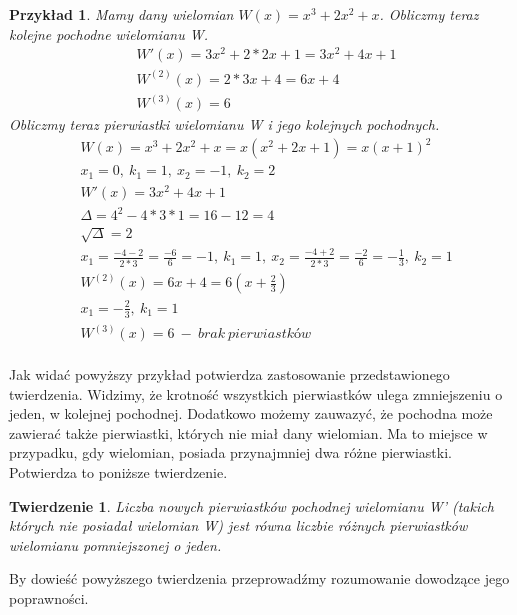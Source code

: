 \documentclass[twoside,a4paper]{book}
\newtheorem{theorem}{Twierdzenie}
\newtheorem{example}{Przykład}
\begin{document}
\begin{example}
	Mamy dany wielomian $W(x) = x^3 + 2x^2 + x$. Obliczmy teraz kolejne pochodne wielomianu W.
	\begin{equation}
	\begin{split}
	&W'(x) = 3x^2 + 2*2x + 1 = 3x^2 + 4x + 1 \\
	&W^{(2)}(x) = 2*3x + 4 = 6x + 4 \\
	&W^{(3)}(x) = 6
	\end{split}
	\end{equation}
	Obliczmy teraz pierwiastki wielomianu W i jego kolejnych pochodnych.
	\begin{equation}
	\begin{split}
	&W(x) = x^3 + 2x^2 + x = x(x^2 + 2x +1) = x(x + 1)^2 \\
	&x_1 = 0,\ k_1 = 1,\ x_2 = -1,\ k_2 = 2 \\
	&W'(x) = 3x^2 + 4x + 1 \\
	&\Delta = 4^2 - 4*3*1 = 16 - 12 = 4 \\
	&\sqrt{\Delta} = 2 \\
	&x_1 = \frac{-4-2}{2*3} = \frac{-6}{6} = -1,\ k_1 = 1,\ x_2 = \frac{-4+2}{2*3} = \frac{-2}{6} = -\frac{1}{3},\ k_2 = 1 \\
	&W^{(2)}(x) = 6x + 4 = 6 (x + \frac{2}{3}) \\
	&x_1 = -\frac{2}{3},\ k_1 = 1 \\
	&W^{(3)}(x) = 6\ -\ brak\ pierwiastków \\
	\end{split}
	\end{equation}
\end{example}

Jak widać powyższy przykład potwierdza zastosowanie przedstawionego twierdzenia. Widzimy, że krotność wszystkich pierwiastków ulega zmniejszeniu o jeden, w kolejnej pochodnej. Dodatkowo możemy zauwazyć, że pochodna może zawierać także pierwiastki, których nie miał dany wielomian. Ma to miejsce w przypadku, gdy wielomian, posiada przynajmniej dwa różne pierwiastki. Potwierdza to poniższe twierdzenie.

\begin{theorem}
	Liczba nowych pierwiastków pochodnej wielomianu W' (takich których nie posiadał wielomian W) jest równa liczbie różnych pierwiastków wielomianu pomniejszonej o jeden.
\end{theorem}

By dowieść powyższego twierdzenia przeprowadźmy rozumowanie dowodzące jego poprawności.
\end{document}
